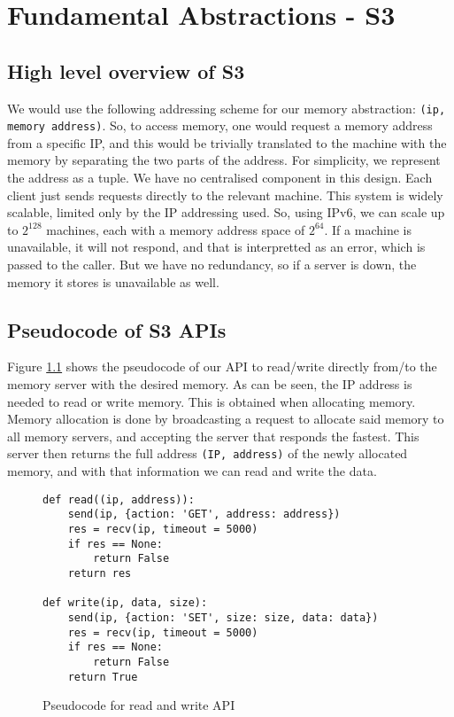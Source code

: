 \chapter{Fundamental Abstractions - S3}

\section{High level overview of S3}
We would use the following addressing scheme for our memory abstraction: \texttt{(ip, memory address)}. So, to access memory, one would request a memory address from a specific IP, and this would be trivially translated to the machine with the memory by separating the two parts of the address. For simplicity, we represent the address as a tuple.\n
We have no centralised component in this design. Each client just sends requests directly to the relevant machine. This system is widely scalable, limited only by the IP addressing used. So, using IPv6, we can scale up to $2^{128}$ machines, each with a memory address space of $2^{64}$.\n
If a machine is unavailable, it will not respond, and that is interpretted as an error, which is passed to the caller. But we have no redundancy, so if a server is down, the memory it stores is unavailable as well.

\section{Pseudocode of S3 APIs}
Figure \ref{pseudocode} shows the pseudocode of our API to read/write directly from/to the memory server with the desired memory. As can be seen, the IP address is needed to read or write memory. This is obtained when allocating memory. Memory allocation is done by broadcasting a request to allocate said memory to all memory servers, and accepting the server that responds the fastest. This server then returns the full address \texttt{(IP, address)} of the newly allocated memory, and with that information we can read and write the data.

\begin{figure}
\begin{verbatim}
def read((ip, address)):
    send(ip, {action: 'GET', address: address})
    res = recv(ip, timeout = 5000)
    if res == None:
        return False
    return res

def write(ip, data, size):
    send(ip, {action: 'SET', size: size, data: data})
    res = recv(ip, timeout = 5000)
    if res == None:
        return False
    return True
\end{verbatim}
\caption{Pseudocode for read and write API \label{pseudocode}}
\end{figure}

